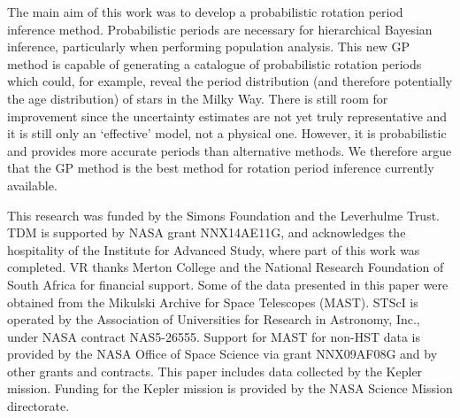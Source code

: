 \documentclass[useAMS, usenatbib, preprint, 12pt]{aastex}
\begin{document}
The main aim of this work was to develop a probabilistic rotation period
inference method.
Probabilistic periods are necessary for hierarchical Bayesian inference,
particularly when performing population analysis.
This new GP method is capable of generating a catalogue of probabilistic
rotation periods which could, for example, reveal the period distribution
(and therefore potentially the age distribution) of stars in the Milky Way.
There is still room for improvement since the uncertainty estimates are not
yet truly representative and it is still only an `effective' model, not a
physical one.
However, it is probabilistic and provides more accurate periods than
alternative methods.
We therefore argue that the GP method is the best method for rotation period
inference currently available.

This research was funded by the Simons Foundation and the Leverhulme Trust.
TDM is supported by NASA grant NNX14AE11G, and acknowledges the
hospitality of the Institute for Advanced Study,
where part of this work was completed.
VR thanks Merton College and the National Research Foundation of South Africa
for financial support.
Some of the data presented in this paper were obtained from the Mikulski
Archive for Space Telescopes (MAST).
STScI is operated by the Association of Universities for Research in
Astronomy, Inc., under NASA contract NAS5-26555.
Support for MAST for non-HST data is provided by the NASA Office of Space
Science via grant NNX09AF08G and by other grants and contracts.
This paper includes data collected by the Kepler mission. Funding for the
Kepler mission is provided by the NASA Science Mission directorate.



\end{document}
